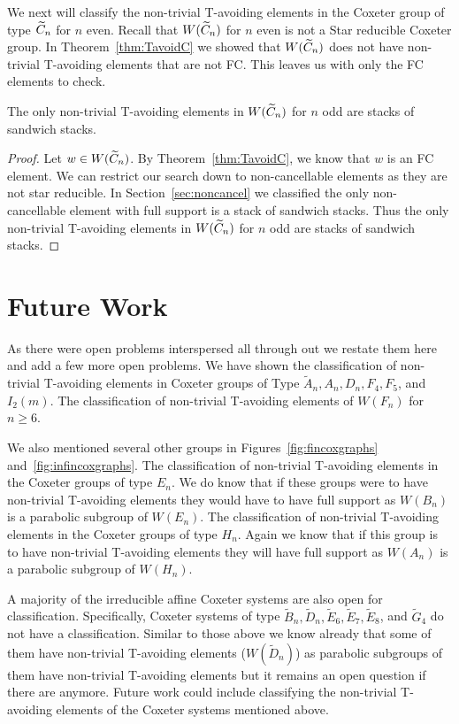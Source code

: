 We next will classify the non-trivial T-avoiding elements in the Coxeter group of type $\widetilde{C}_n$ for $n$ even. Recall that $W(\widetilde{C}_n)$ for $n$ even is not a Star reducible Coxeter group. In Theorem~\ref{thm:TavoidC} we showed that $W(\widetilde{C}_n)$ does not have non-trivial T-avoiding elements that are not FC. This leaves us with only the FC elements to check.

\begin{theorem}
	The only non-trivial T-avoiding elements in $W(\widetilde{C}_n)$ for $n$ odd are stacks of sandwich stacks.
	\begin{proof}
		Let $w \in W(\widetilde{C}_n)$. By Theorem~\ref{thm:TavoidC}, we know that $w$ is an FC element. We can restrict our search down to non-cancellable elements as they are not star reducible. In Section~\ref{sec:noncancel} we classified the only non-cancellable element with full support is a stack of sandwich stacks. Thus the only non-trivial T-avoiding elements in $W(\widetilde{C}_n)$ for $n$ odd are stacks of sandwich stacks.
	\end{proof}
\end{theorem}


\section{Future Work}
As there were open problems interspersed all through out we restate them here and add a few more open problems. We have shown the classification of non-trivial T-avoiding elements in Coxeter groups of Type $\widetilde{A}_n, A_n, D_n, F_4, F_5$, and $I_2(m)$. The classification of non-trivial T-avoiding elements of $W(F_n)$ for $n \geq 6$.

We also mentioned several other groups in Figures~\ref{fig:fincoxgraphs} and~\ref{fig:infincoxgraphs}. The classification of non-trivial T-avoiding elements in the Coxeter groups of type $E_n$. We do know that if these groups were to have non-trivial T-avoiding elements they would have to have full support as $W(B_n)$ is a parabolic subgroup of $W(E_n)$. The classification of non-trivial T-avoiding elements in the Coxeter groups of type $H_n$. Again we know that if this group is to have non-trivial T-avoiding elements they will have full support as $W(A_n)$ is a parabolic subgroup of $W(H_n)$. 

A majority of the irreducible affine Coxeter systems are also open for classification. Specifically, Coxeter systems of type $\widetilde{B}_n, \widetilde{D}_n, \widetilde{E}_6, \widetilde{E}_7, \widetilde{E}_8$, and $\widetilde{G}_4$ do not have a classification. Similar to those above we know already that some of them have non-trivial T-avoiding elements ($W(\widetilde{D}_n)$) as parabolic subgroups of them have non-trivial T-avoiding elements but it remains an open question if there are anymore. Future work could include classifying the non-trivial T-avoiding elements of the Coxeter systems mentioned above.